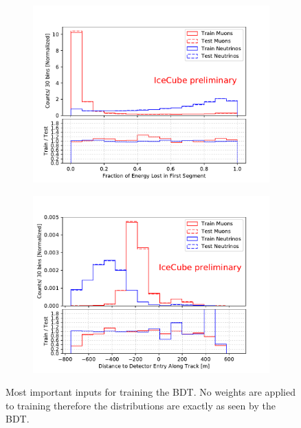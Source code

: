 \documentclass{PoS}
\begin{document}
\begin{figure}[h!]
  \centering
  \begin{subfigure}[b]{0.49\linewidth}
    \includegraphics[width=\linewidth]{bdt_input_Fraction_of_Energy_Lost_in_First_Segment.pdf}
  \end{subfigure}
  \begin{subfigure}[b]{0.49\linewidth}
    \includegraphics[width=\linewidth]{bdt_input_Distance_to_Detector_Entry_Along_Track.pdf}
  \end{subfigure}
  \caption{Most important inputs for training the BDT. No weights are applied to training therefore the distributions are exactly as seen by the BDT.}
  \label{fig:BDTinputs}
\end{figure}
\end{document}
